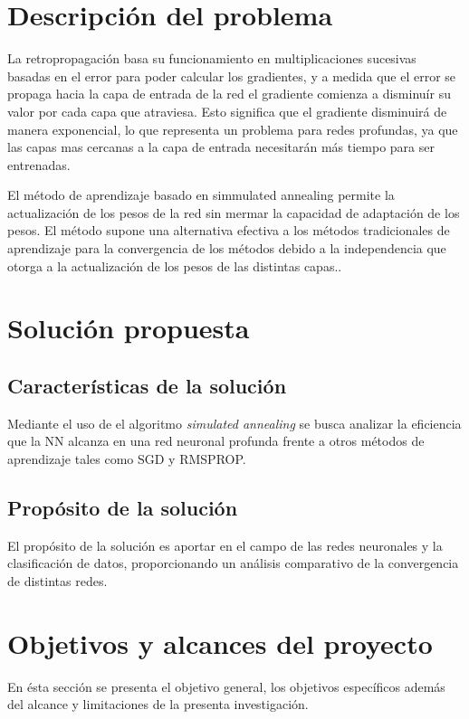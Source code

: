 \section{Descripción del problema}
La retropropagación basa su funcionamiento en multiplicaciones sucesivas basadas en el error para poder calcular los gradientes, y a medida que el error se propaga hacia la capa de entrada de la red el gradiente comienza a disminuír su valor por cada capa que atraviesa. Esto significa que el gradiente disminuirá de manera exponencial, lo que representa un problema para redes profundas, ya que las capas mas cercanas a la capa de entrada necesitarán más tiempo para ser entrenadas.

El método de aprendizaje basado en simmulated annealing permite la actualización de los pesos de la red sin mermar la capacidad de adaptación de los pesos. El método supone una alternativa efectiva a los métodos tradicionales de aprendizaje para la convergencia de los métodos debido a la independencia que otorga a la actualización de los pesos de las distintas capas..


\section{Solución propuesta}
\subsection{Características de la solución}
Mediante el uso de el algoritmo {\em simulated annealing} se busca analizar la eficiencia que la NN alcanza en una red neuronal profunda frente a otros métodos de aprendizaje tales como SGD y RMSPROP.

\subsection{Propósito de la solución}
El propósito de la solución es aportar en el campo de las redes neuronales y la clasificación de datos, proporcionando un análisis comparativo de la convergencia de distintas redes.

\section{Objetivos y alcances del proyecto}
En ésta sección se presenta el objetivo general, los objetivos específicos además del alcance y limitaciones de la presenta investigación.

